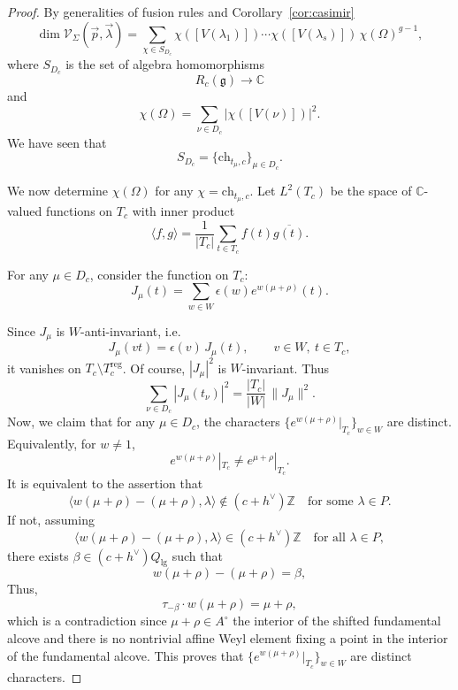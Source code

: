 \documentclass[12pt]{article}
\begin{document}
\begin{proof}
By generalities of fusion rules and Corollary~\ref{cor:casimir}
\begin{equation}
\dim \mathcal V_\Sigma(\vec p,\vec\lambda)
=
\sum_{\chi\in S_{D_c}}
\chi([V(\lambda_1)])\cdots \chi([V(\lambda_s)])\, \chi(\Omega)^{g-1},
\end{equation}
where $S_{D_c}$ is the set of algebra homomorphisms
\[
R_c(\mathfrak g)\to \mathbb C
\]
and
\begin{equation}
\chi(\Omega)=\sum_{\nu\in D_c} |\chi([V(\nu)])|^2.
\end{equation}
We have seen that
\begin{equation}
S_{D_c}=\{\mathrm{ch}_{t_\mu,c}\}_{\mu\in D_c}.
\end{equation}

We now determine $\chi(\Omega)$ for any $\chi=\mathrm{ch}_{t_\mu,c}$.
Let $L^2(T_c)$ be the space of $\mathbb C$-valued functions on $T_c$ with inner product
\[
\langle f,g\rangle
=
\frac{1}{|T_c|}\sum_{t\in T_c} f(t)\overline{g(t)}.
\]

For any $\mu\in D_c$, consider the function on $T_c$:
\[
J_\mu(t)=\sum_{w\in W}\epsilon(w)e^{w(\mu+\rho)}(t).
\]

Since $J_\mu$ is $W$-anti-invariant, i.e.
\[
J_\mu(vt)=\epsilon(v)\,J_\mu(t),\qquad v\in W,\ t\in T_c,
\]
it vanishes on $T_c\setminus T_c^{\mathrm{reg}}$. Of course, $|J_\mu|^2$ is $W$-invariant. Thus
\begin{equation}
\sum_{\nu\in D_c} |J_\mu(t_\nu)|^2
=
\frac{|T_c|}{|W|}\,\|J_\mu\|^2.
\end{equation}
Now, we claim that for any $\mu\in D_c$, the characters $\{e^{w(\mu+\rho)}|_{T_c}\}_{w\in W}$
are distinct. Equivalently, for $w\neq 1$,
\[
e^{w(\mu+\rho)}|_{T_c}\neq e^{\mu+\rho}|_{T_c}.
\]
It is equivalent to the assertion that
\[
\langle w(\mu+\rho)-(\mu+\rho),\lambda\rangle \notin (c+h^\vee)\mathbb Z
\quad \text{for some } \lambda\in P.
\]
If not, assuming
\[
\langle w(\mu+\rho)-(\mu+\rho),\lambda\rangle \in (c+h^\vee)\mathbb Z
\quad\text{for all }\lambda\in P,
\]
there exists $\beta\in (c+h^\vee)Q_{\mathrm{lg}}$ such that
\[
w(\mu+\rho)-(\mu+\rho)=\beta,
\]
Thus,
\[
\tau_{-\beta}\cdot w(\mu+\rho)=\mu+\rho,
\]
which is a contradiction since $\mu+\rho\in A^\circ$ the interior of the shifted fundamental alcove and there is no nontrivial affine Weyl element fixing a point in the interior of the fundamental alcove.
This proves that \(\{e^{w(\mu+\rho)}|_{T_c}\}_{w\in W}\) are distinct characters.


\end{proof}
\end{document}
